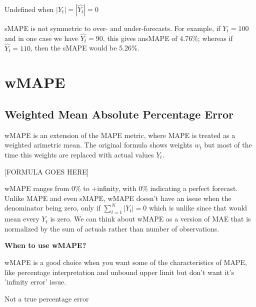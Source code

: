 {
    \item Undefined when $|Y_{t}| = |\hat{Y_{t}}| = 0$
    \item sMAPE is not symmetric to over- and under-forecasts. For example, if $Y_{t} = 100$ and in one case we have $\hat{Y_{t}} = 90$, this gives ansMAPE of 4.76\%; whereas if $\hat{Y_{t}} = 110$, then the sMAPE would be 5.26\%.
}


\clearpage
\thispagestyle{regressionstyle}
\section{wMAPE}
\subsection{Weighted Mean Absolute Percentage Error}

wMAPE is an extension of the MAPE metric, where MAPE is treated as a weighted arimetric mean. The original formula shows weights $w_{t}$ but most of the time this weights are replaced
with actual values $Y_{t}$.

\begin{center}
    [FORMULA GOES HERE]
\end{center}

wMAPE ranges from 0\% to +infinity, with 0\% indicating a perfect forecast. Unlike MAPE and even sMAPE, wMAPE doesn't have an issue when the denominator being zero,
only if $\sum_{t=1}^{N}|Y_{t}| = 0$ which is unlike since that would mean every $Y_{t}$ is zero. We can think about wMAPE as a version of MAE that is normalized by the sum of
actuals rather than number of observations.

\textbf{When to use wMAPE?}

wMAPE is a good choice when you want some of the characteristics of MAPE, like percentage interpretation and unbound upper limit but don't want it's 'infinity error' issue.

{
    \item Not a true percentage error
}

